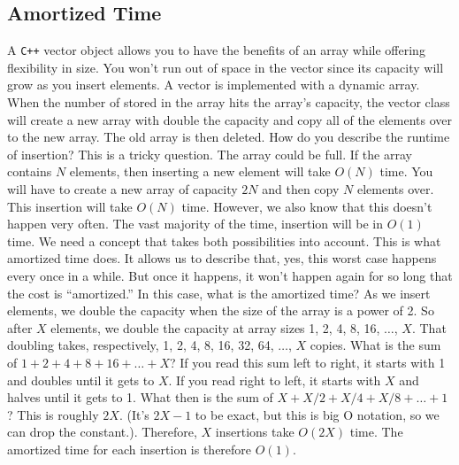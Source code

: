 \documentclass{report}
\begin{document}
    \subsection{Amortized Time}
    \bigbreak \noindent 
    A \texttt{C++} vector object allows you to have the benefits of an array while offering flexibility in size.
    You won’t run out of space in the vector since its capacity will grow as you insert elements.
    A vector is implemented with a dynamic array. When the number of stored in the array hits the
    array’s capacity, the vector class will create a new array with double the capacity and copy all of
    the elements over to the new array. The old array is then deleted.
    \bigbreak \noindent 
    How do you describe the runtime of insertion? This is a tricky question.
    The array could be full. If the array contains \(N\) elements, then inserting a new element will take
    \(O(N)\) time. You will have to create a new array of capacity \(2N\) and then copy \(N\) elements over. This
    insertion will take \(O(N)\) time.
    However, we also know that this doesn’t happen very often. The vast majority of the time, insertion
    will be in \(O(1)\) time.
    \bigbreak \noindent 
    We need a concept that takes both possibilities into account. This is what amortized time does. It
    allows us to describe that, yes, this worst case happens every once in a while. But once it
    happens, it won’t happen again for so long that the cost is “amortized.”
    \bigbreak \noindent 
    In this case, what is the amortized time?
    As we insert elements, we double the capacity when the size of the array is a power of 2. So after
    \(X\) elements, we double the capacity at array sizes 1, 2, 4, 8, 16, \(\ldots\), \(X\). That doubling takes,
    respectively, 1, 2, 4, 8, 16, 32, 64, \(\ldots\), \(X\) copies.
    \bigbreak \noindent 
    What is the sum of \(1 + 2 + 4 + 8 + 16 + \ldots + X\)? If you read this sum left to right, it starts with 1 and
    doubles until it gets to \(X\). If you read right to left, it starts with \(X\) and halves until it gets to 1.
    What then is the sum of \(X + X/2 + X/4 + X/8 + \ldots + 1\)? This is roughly \(2X\).
    (It's \(2X - 1\) to be exact, but this is big O notation, so we can drop the constant.).
    \bigbreak \noindent 
    Therefore, \(X\) insertions take \(O(2X)\) time. The amortized time for each insertion is therefore \(O(1)\).

    \bigbreak \noindent 
\end{document}
